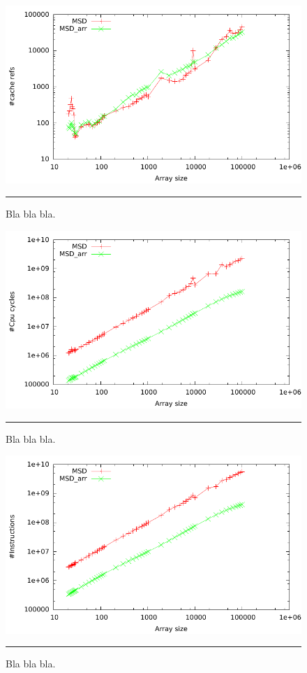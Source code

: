 \begin{figure}[htbp]
	\centering
		\includegraphics[width=\textwidth]{./Figures/Project2b/Cache_refs.pdf}
		\rule{35em}{0.5pt}
	\caption[Cache refs]{
	Bla bla bla.
	}
	\label{fig:Cache_refs_p2b}
\end{figure}



\begin{figure}[htbp]
	\centering
		\includegraphics[width=\textwidth]{./Figures/Project2b/Cpu_cycles.pdf}
		\rule{35em}{0.5pt}
	\caption[CPU cycles]{
	Bla bla bla.
	}
	\label{fig:Cpu_cycles_p2b}
\end{figure}


\begin{figure}[htbp]
	\centering
		\includegraphics[width=\textwidth]{./Figures/Project2b/Instructions.pdf}
		\rule{35em}{0.5pt}
	\caption[Instructions]{
	Bla bla bla.
	}
	\label{fig:Instructions_p2b}
\end{figure}


